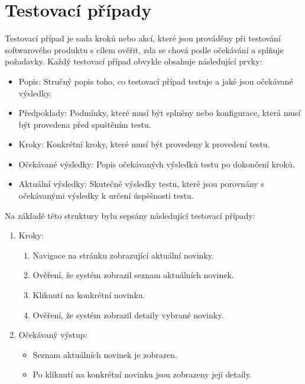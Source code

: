 \section{Testovací případy}
Testovací případ je sada kroků nebo akcí, které jsou prováděny při testování softwarového produktu s cílem ověřit, zda se chová podle očekávání a splňuje 
požadavky. Každý testovací případ obvykle obsahuje následující prvky:

\begin{itemize}
  \item Popis: Stručný popis toho, co testovací případ testuje a jaké jsou očekávané výsledky.
  \item Předpoklady: Podmínky, které musí být splněny nebo konfigurace, která musí být provedena před spuštěním testu.
  \item Kroky: Konkrétní kroky, které musí být provedeny k provedení testu.
  \item Očekávané výsledky: Popis očekávaných výsledků testu po dokončení kroků.
  \item Aktuální výsledky: Skutečné výsledky testu, které jsou porovnány s očekávanými výsledky k určení úspěšnosti testu.
\end{itemize}

Na základě této struktury bylu sepsány následující testovací případy:



\begin{enumerate}
  \item Kroky:
    \begin{enumerate}
      \item Navigace na stránku zobrazující aktuální novinky.
      \item Ověření, že systém zobrazil seznam aktuálních novinek.
      \item Kliknutí na konkrétní novinku.
      \item Ověření, že systém zobrazil detaily vybrané novinky.
    \end{enumerate}
  \item Očekávaný výstup:
    \begin{itemize}
      \item Seznam aktuálních novinek je zobrazen.
      \item Po kliknutí na konkrétní novinku jsou zobrazeny její detaily.
    \end{itemize}
\end{enumerate}

